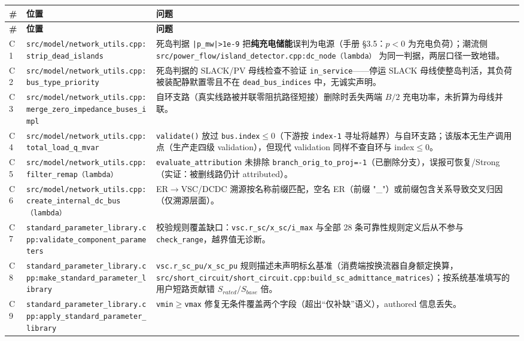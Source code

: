 \documentclass[11pt,a4paper,fontset=fandol]{ctexart}
\newcommand{\file}[1]{\texttt{#1}}
\begin{document}
\begin{footnotesize}
\begin{longtable}{@{}p{0.7cm}p{5.2cm}p{9.3cm}@{}}
\toprule
\textbf{\#} & \textbf{位置} & \textbf{问题}\\
\midrule
\endfirsthead
\toprule
\textbf{\#} & \textbf{位置} & \textbf{问题}\\
\midrule
\endhead
C1 & \file{src/model/network\_utils.cpp:strip\_dead\_islands} & 死岛判据 \texttt{|p\_mw|>1e-9} 把\textbf{纯充电储能}误判为电源（手册 \S 3.5：$p<0$ 为充电负荷）；潮流侧 \file{src/power\_flow/island\_detector.cpp:dc\_node（lambda）} 为同一判据，两层口径一致地错。\\
C2 & \file{src/model/network\_utils.cpp:bus\_type\_priority} & 死岛判据的 SLACK/PV 母线检查不验证 \texttt{in\_service}——停运 SLACK 母线使整岛判活，其负荷被装配静默置零且不在 \texttt{dead\_bus\_indices} 中，无诚实声明。\\
C3 & \file{src/model/network\_utils.cpp:merge\_zero\_impedance\_buses\_impl} & 自环支路（真实线路被并联零阻抗路径短接）删除时丢失两端 $B/2$ 充电功率，未折算为母线并联。\\
C4 & \file{src/model/network\_utils.cpp:total\_load\_q\_mvar} & \texttt{validate()} 放过 \texttt{bus.index}$\le 0$（下游按 \texttt{index-1} 寻址将越界）与自环支路；该版本无生产调用点（生产走四级 validation），但现代 validation 同样不查自环与 index$\le 0$。\\
C5 & \file{src/model/network\_utils.cpp:filter\_remap（lambda）} & \texttt{evaluate\_attribution} 未排除 \texttt{branch\_orig\_to\_proj=-1}（已删除分支），误报可恢复/Strong（实证：被删线路仍计 attributed）。\\
C6 & \file{src/model/network\_utils.cpp:create\_internal\_dc\_bus（lambda）} & ER$\to$VSC/DCDC 溯源按名称前缀匹配，空名 ER（前缀 "\_"）或前缀包含关系导致交叉归因（仅溯源层面）。\\
C7 & \file{standard\_parameter\_library.cpp:validate\_component\_parameters} & 校验规则覆盖缺口：\texttt{vsc.r\_sc/x\_sc/i\_max} 与全部 28 条可靠性规则定义后从不参与 \texttt{check\_range}，越界值无诊断。\\
C8 & \file{standard\_parameter\_library.cpp:make\_standard\_parameter\_library} & \texttt{vsc.r\_sc\_pu/x\_sc\_pu} 规则描述未声明标幺基准（消费端按换流器自身额定换算，\file{src/short\_circuit/short\_circuit.cpp:build\_sc\_admittance\_matrices}）；按系统基准填写的用户短路贡献错 $S_{rated}/S_{base}$ 倍。\\
C9 & \file{standard\_parameter\_library.cpp:apply\_standard\_parameter\_library} & \texttt{vmin$\ge$vmax} 修复无条件覆盖两个字段（超出``仅补缺''语义），authored 信息丢失。\\

\end{longtable}
\end{footnotesize}
\end{document}
